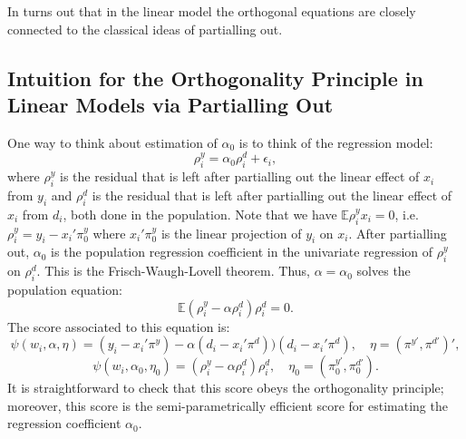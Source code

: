 \documentclass{amsart}\usepackage[]{graphicx}\usepackage[]{color}
\begin{document}
In turns out that in the linear model the orthogonal equations are closely connected to the classical ideas of partialling out.

\subsection{Intuition for the  Orthogonality Principle in Linear Models via Partialling Out}  One way to think about estimation of $\alpha_0$ is to think of the regression model:
$$
\rho^y_i = \alpha_0 \rho^d_i + \epsilon_i,  
$$
where $\rho^y_i$ is the residual that is left after partialling out the linear effect of $x_i$ from $y_i$ and $\rho^d_i$ is the residual that is left after partialling out the linear effect of $x_i$ from $d_i$, both done in the population.  Note that we have
$\mathbb{E} \rho^y_i  x_i =0$, i.e. $\rho^y_i = y_i - x_i'\pi^y_0$ where $x_i'\pi^y_0$ is the linear projection of $y_i$ on $x_i$.  After partialling out,  $\alpha_0$ is the population regression coefficient in the univariate regression of $\rho^y_i$ on $\rho^d_i$.  This is the Frisch-Waugh-Lovell theorem.   Thus, $\alpha=\alpha_0$ solves the population equation:
$$
\mathbb{E} (\rho^y_i - \alpha \rho^d_i)\rho^d_i = 0.
$$
The score associated to this equation is:
$$
\psi(w_i, \alpha, \eta) = (y_i - x_i'\pi^y) - \alpha (d_i - x_i'\pi^d))(d_i - x_i'\pi^d),  \quad \eta = (\pi^{y'}, \pi^{d'})', 
$$$$
\psi(w_i, \alpha_0, \eta_0) = (\rho^y_i - \alpha \rho^d_i)\rho^d_i, \quad \eta_0 = (\pi^{y'}_0, \pi^{d'}_0).
$$
It is straightforward to check that this score obeys the orthogonality principle; moreover, this score is the semi-parametrically efficient score for estimating the regression coefficient $\alpha_0$.
\end{document}
